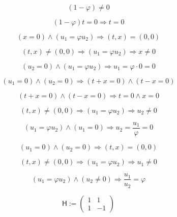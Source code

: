 \documentclass[12pt]{article}
\begin{document}
\begin{equation}
(1-\varphi)\neq 0
\end{equation}

\begin{equation}
(1-\varphi)t=0\Longrightarrow t=0
\end{equation}

\begin{equation}
(x=0)\wedge(u_1=\varphi u_2)\Longrightarrow (t,x)=(0,0)
\end{equation}

\begin{equation}
(t,x)\neq(0,0)\Longrightarrow (u_1=\varphi u_2)\Longrightarrow x\neq 0
\end{equation}

\begin{equation}
(u_2=0)\wedge(u_1=\varphi u_2)\Longrightarrow u_1=\varphi\cdot 0=0
\end{equation}

\begin{equation}
(u_1=0)\wedge(u_2=0)\Longrightarrow (t+x=0)\wedge(t-x=0)
\end{equation}

\begin{equation}
(t+x=0)\wedge(t-x=0)\Longrightarrow t=0\wedge x=0
\end{equation}

\begin{equation}
(t,x)\neq(0,0)\Longrightarrow (u_1=\varphi u_2)\Longrightarrow u_2\neq 0
\end{equation}

\begin{equation}
(u_1=\varphi u_2)\wedge(u_1=0)\Longrightarrow u_2=\frac{u_1}{\varphi}=0
\end{equation}

\begin{equation}
(u_1=0)\wedge(u_2=0)\Longrightarrow (t,x)=(0,0)
\end{equation}

\begin{equation}
(t,x)\neq(0,0)\Longrightarrow (u_1=\varphi u_2)\Longrightarrow u_1\neq 0
\end{equation}

\begin{equation}
(u_1=\varphi u_2)\wedge(u_2\neq 0)\Longrightarrow \frac{u_1}{u_2}=\varphi
\end{equation}

\begin{equation}
\mathsf{H}:=\begin{pmatrix}1&1\\[2pt]1&-1\end{pmatrix}
\end{equation}
\end{document}
